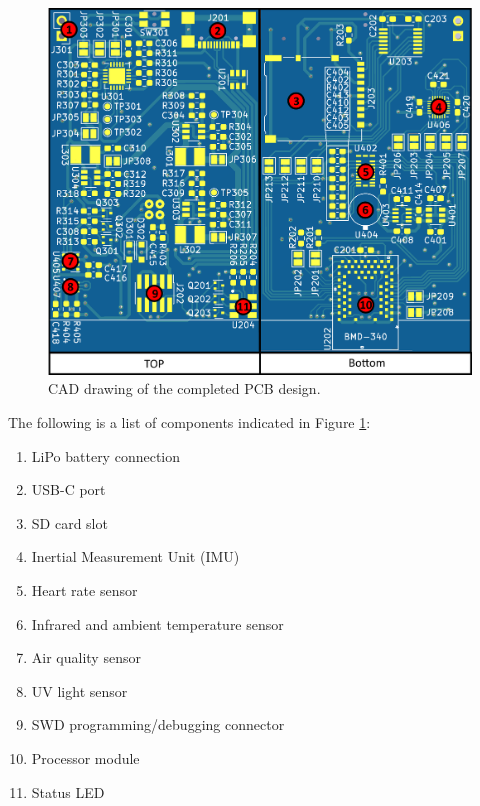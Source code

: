 \begin{figure}[!htb]
\centering
\includegraphics[width=\textwidth]{images/Board_TopBottom_Annotated.png}
\caption{CAD drawing of the completed PCB design.}
\label{fig:Board_TopBottom_Annotated}
\end{figure}

The following is a list of components indicated in Figure \ref{fig:Board_TopBottom_Annotated}: 
\begin{enumerate}
   \item LiPo battery connection
   \item USB-C port
   \item SD card slot 
   \item Inertial Measurement Unit (IMU)
   \item Heart rate sensor
   \item Infrared and ambient temperature sensor
   \item Air quality sensor
   \item UV light sensor
   \item SWD programming/debugging connector
   \item Processor module
   \item Status LED
\end{enumerate}

